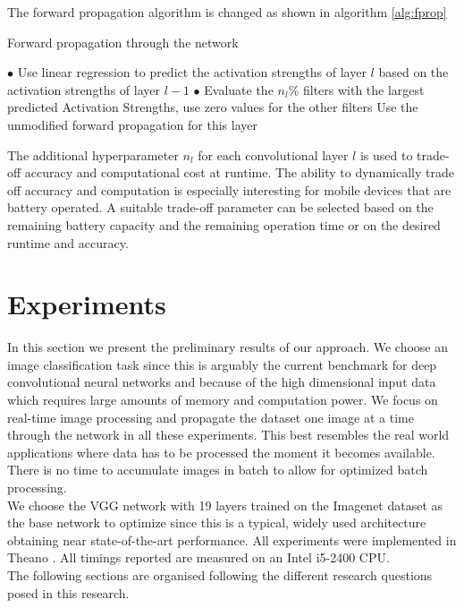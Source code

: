 \documentclass{article}
\begin{document}
The forward propagation algorithm is changed as shown in algorithm \ref{alg:fprop}
\begin{algorithm}[h]
   \caption{Forward propagation through the network}
   \label{alg:fprop}
\begin{algorithmic}
   \STATE $\bullet$ Use linear regression to predict the activation strengths of layer $l$ based on the activation strengths of layer $l-1$
   \STATE $\bullet$ Evaluate the $n_l\%$ filters with the largest predicted Activation Strengths, use zero values for the other filters
   \ELSE
   \STATE Use the unmodified forward propagation for this layer
   \ENDIF
   \ENDFOR
\end{algorithmic}
\end{algorithm}
The additional hyperparameter $n_l$ for each convolutional layer $l$ is used to trade-off accuracy and computational cost at runtime. The ability to dynamically trade off accuracy and computation is especially interesting for mobile devices that are battery operated. A suitable trade-off parameter can be selected based on the remaining battery capacity and the remaining operation time or on the desired runtime and accuracy.

\section{Experiments}
\label{experiments}
In this section we present the preliminary results of our approach. We choose an image classification task since this is arguably the current benchmark for deep convolutional neural networks and because of the high dimensional input data which requires large amounts of memory and computation power. We focus on real-time image processing and propagate the dataset one image at a time through the network in all these experiments. This best resembles the real world applications where data has to be processed the moment it becomes available. There is no time to accumulate images in batch to allow for optimized batch processing.
\\
\newline
We choose the VGG network \cite{simonyan2014very} with 19 layers trained on the Imagenet \cite{deng2009imagenet} dataset as the base network to optimize since this is a typical, widely used architecture obtaining near state-of-the-art performance. All experiments were implemented in Theano \cite{bergstra+al:2010-scipy}. All timings reported are measured on an Intel i5-2400 CPU.
\\
\newline
The following sections are organised following the different research questions posed in this research.
\end{document}
